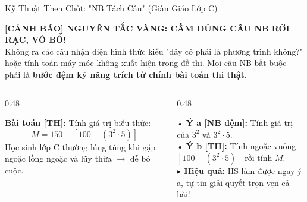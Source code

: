 \documentclass[aspectratio=169,11pt]{beamer}
\begin{document}
\begin{frame}{Kỹ Thuật Then Chốt: "NB Tách Câu" (Giàn Giáo Lớp C)}
  \begin{tcolorbox}[dangercard]
    \scriptsize
    \textbf{\textbf{[CẢNH BÁO]} NGUYÊN TẮC VÀNG: CẤM DÙNG CÂU NB RỜI RẠC, VÔ BỔ!}\\
    Không ra các câu nhận diện hình thức kiểu "đây có phải là phương trình không?" hoặc tính toán máy móc không xuất hiện trong đề thi. Mọi câu NB bắt buộc phải là \textbf{bước đệm kỹ năng trích từ chính bài toán thi thật}.
  \end{tcolorbox}
  \vspace{2pt}
  \begin{columns}[T]
    \begin{column}{0.48\textwidth}
      \begin{tcolorbox}[slidecard, title=Bài Toán Đích Trong Đề Thi Thật]
        \scriptsize
        \textbf{Bài toán [TH]:} Tính giá trị biểu thức:
        \[ M = 150 - [100 - (3^2 \cdot 5)] \]
        {\color{muted}Học sinh lớp C thường lúng túng khi gặp ngoặc lồng ngoặc và lũy thừa $\to$ dễ bỏ cuộc.}
      \end{tcolorbox}
    \end{column}

    \begin{column}{0.48\textwidth}
      \begin{tcolorbox}[successcard, title=Chẻ Giàn Giáo Leo Dốc (Scaffolding)]
        \scriptsize
        • \textbf{Ý a [NB đệm]:} Tính giá trị của $3^2$ và $3^2 \cdot 5$.\\[3pt]
        • \textbf{Ý b [TH]:} Tính ngoặc vuông $[100 - (3^2 \cdot 5)]$ rồi tính $M$.\\[5pt]
        {\color{success}\textbf{$\blacktriangleright$ Hiệu quả:}} HS làm được ngay ý a, tự tin giải quyết trọn vẹn cả bài!
      \end{tcolorbox}
    \end{column}
  \end{columns}
\end{frame}
\end{document}
